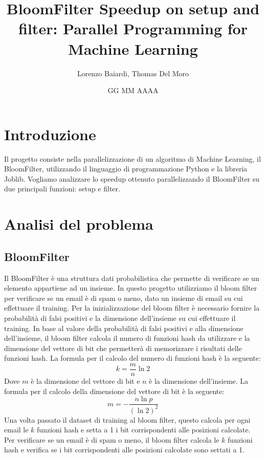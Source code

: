 \documentclass[11pt]{article}
\title{BloomFilter Speedup on setup and filter: Parallel Programming for Machine Learning}
\author{Lorenzo Baiardi, Thomas Del Moro}
\date{GG MM AAAA}
\begin{document}
    \maketitle
    \clearpage

    \tableofcontents
    \clearpage

    \section{Introduzione}\label{sec:introduzione}
    Il progetto consiste nella parallelizzazione di un algoritmo di Machine Learning, il BloomFilter, utilizzando il linguaggio di programmazione Python e la libreria Joblib.
    Vogliamo analizzare lo speedup ottenuto parallelizzando il BloomFilter su due principali funzioni: setup e filter.
    \clearpage

    \section{Analisi del problema}\label{sec:analisi-del-problema}
    \subsection{BloomFilter}\label{subsec:bloomfilter}
    Il BloomFilter è una struttura dati probabilistica che permette di verificare se un elemento appartiene ad un insieme.
    In questo progetto utilizziamo il bloom filter per verificare se un email è di spam o meno, dato un insieme di email su cui effettuare il training.
    Per la inizializzazione del bloom filter è necessario fornire la probabilità di falsi positivi e la dimensione dell'insieme su cui effettuare il training.
    In base al valore della probabilità di falsi positivi e alla dimensione dell'insieme, il bloom filter calcola il numero di funzioni hash da utilizzare e la dimensione del vettore di bit che permetterà
    di memorizzare i risultati delle funzioni hash.
    La formula per il calcolo del numero di funzioni hash è la seguente:
    \begin{equation}
        k = \frac{m}{n} \ln{2}\label{eq:num_hash}
    \end{equation}
    Dove $m$ è la dimensione del vettore di bit e $n$ è la dimensione dell'insieme.
    La formula per il calcolo della dimensione del vettore di bit è la seguente:
    \begin{equation}
        m = -\frac{n \ln{p}}{(\ln{2})^2}\label{eq:dim_bit}
    \end{equation}
    Una volta passato il dataset di training al bloom filter, questo calcola per ogni email le $k$ funzioni hash e setta a 1 i bit corrispondenti alle posizioni calcolate.
    Per verificare se un email è di spam o meno, il bloom filter calcola le $k$ funzioni hash e verifica se i bit corrispondenti alle posizioni calcolate sono settati a 1.
    \clearpage
\end{document}
